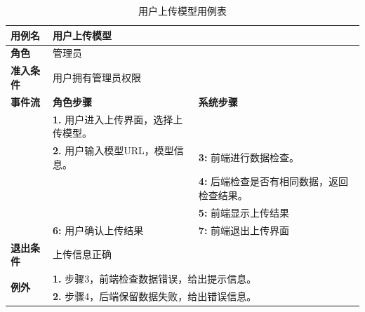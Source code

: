 \begin{table}[H]
  \centering
  \renewcommand\arraystretch{1.1}
  \small
  \caption{用户上传模型用例表}
  \setlength{\tabcolsep}{4mm}
  \begin{tabular}{|p{2cm}|p{5.75cm}|p{5.75cm}|}
    \hline \textbf{用例名} & \multicolumn{2}{l|}{用户上传模型} \\
    \hline \textbf{角色} & \multicolumn{2}{l|}{管理员} \\
    \hline \textbf{准入条件} & \multicolumn{2}{l|}{用户拥有管理员权限} \\
    \hline \textbf{事件流} & \textbf{角色步骤} & \textbf{系统步骤} \\
    \hline \multirow{3}{*}{~} & \textbf{1.} 用户进入上传界面，选择上传模型。  &    \\
    \cline{2-3} & \textbf{2.} 用户输入模型URL，模型信息。 & \textbf{3:} 前端进行数据检查。 \\
    \cline{2-3} &  & \textbf{4:} 后端检查是否有相同数据，返回检查结果。 \\
    \cline{2-3} &  & \textbf{5:} 前端显示上传结果 \\
    \cline{2-3} & \textbf{6:} 用户确认上传结果 & \textbf{7:} 前端退出上传界面 \\
    \hline \textbf{退出条件}  & \multicolumn{2}{l|}{上传信息正确} \\
    \hline \multirow{2}{*}{\textbf{例外}} & \multicolumn{2}{l|}{\textbf{1.} 步骤3，前端检查数据错误，给出提示信息。} \\
     & \multicolumn{2}{l|}{\textbf{2.} 步骤4，后端保留数据失败，给出错误信息。} \\
    \hline
  \end{tabular}
\end{table}

